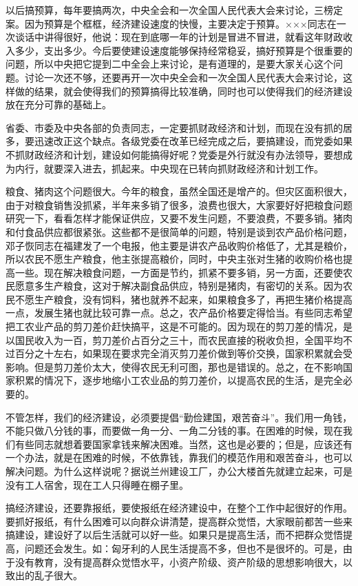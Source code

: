 以后搞预算，每年要搞两次，中央全会和一次全国人民代表大会来讨论，三榜定案。因为预算是个框框，经济建设速度的快慢，主要决定于预算。×××同志在一次谈话中讲得很好，他说：现在到底哪一年的计划是冒进不冒进，就看这年财政收入多少，支出多少。今后要使建设速度能够保持经常稳妥，搞好预算是个很重要的问题，所以中央把它提到二中全会上来讨论，是有道理的，是要大家关心这个问题。讨论一次还不够，还要再开一次中央全会和一次全国人民代表大会来讨论，这样做的结果，就会使得我们的预算搞得比较准确，同时也可以使得我们的经济建设放在充分可靠的基础上。

省委、市委及中央各部的负责同志，一定要抓财政经济和计划，而现在没有抓的居多，要迅速改正这个缺点。各级党委在改革已经完成之后，要搞建设，而党委如果不抓财政经济和计划，建设如何能搞得好呢？党委是外行就没有办法领导，要想成为内行，就要深入进去，抓起来。中央现在已转向抓财政经济和计划工作。

粮食、猪肉这个问题很大。今年的粮食，虽然全国还是增产的。但灾区面积很大，由于对粮食销售没抓紧，半年来多销了很多，浪费也很大，大家要好好把粮食问题研究一下，看看怎样才能保证供应，又要不发生问题，不要浪费，不要多销。猪肉和付食品供应都很紧张。这些都不是很简单的问题，特别是谈到农产品价格问题，邓子恢同志在福建发了一个电报，他主要是讲农产品收购价格低了，尤其是粮价，所以农民不愿生产粮食，他主张提高粮价，同时，中央主张对生猪的收购价格也提高一些。现在解决粮食问题，一方面是节约，抓紧不要多销，另一方面，还要使农民愿意多生产粮食，这对于解决副食品供应，特别是猪肉，有密切的关系。因为农民不愿生产粮食，没有饲料，猪也就养不起来，如果粮食多了，再把生猪价格提高一点，发展生猪也就比较可靠一点。总之，农产品价格要定得恰当。有些同志希望把工农业产品的剪刀差价赶快搞平，这是不可能的。因为现在的剪刀差的情况，是以国民收入为一百，剪刀差价占百分之三十，而农民直接的税收负担，全国平均不过百分之十左右，如果现在要求完全消灭剪刀差价做到等价交换，国家积累就会受影响。但是剪刀差价太大，使得农民无利可图，那也是错误的。总之，在不影响国家积累的情况下，逐步地缩小工农业品的剪刀差价，以提高农民的生活，是完全必要的。

不管怎样，我们的经济建设，必须要提倡“勤俭建国，艰苦奋斗”。我们用一角钱，不能只做八分钱的事，而要做一角一分、一角二分钱的事。在困难的时候，现在我们有些同志就想着要国家拿钱来解决困难。当然，这也是必要的；但是，应该还有一个办法，就是在困难的时候，不依靠钱，靠我们的模范作用和艰苦奋斗，也可以解决问题。为什么这样说呢？据说兰州建设工厂，办公大楼首先就建立起来，可是没有工人宿舍，现在工人只得睡在棚子里。

搞经济建设，还要靠报纸，要使报纸在经济建设中，在整个工作中起很好的作用。要抓好报纸，有什么困难可以向群众讲清楚，提高群众觉悟，大家眼前都苦一些来搞建设，建设好了以后生活就可以好一些。如果只是提高生活，而不把群众觉悟提高，问题还会发生。如：匈牙利的人民生活提高不多，但也不是很坏的。可是，由于没有教育，没有提高群众觉悟水平，小资产阶级、资产阶级的思想影响很大，以致出的乱子很大。

